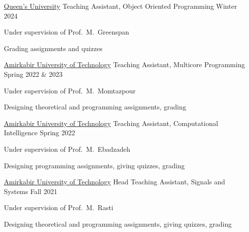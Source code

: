 
\begin{cventries}

\cventry
    {\href{https://www.queensu.ca/}{Queen's University}} %
    {Teaching Assistant, Object Oriented Programming} %
    {} %
    {Winter 2024} %
    {
      \begin{cvitems} %
        \item {Under supervision of Prof.~M.~Greenspan}
        \item {Grading assignments and quizzes}
      \end{cvitems}
    }

\cventry
    {\href{https://aut.ac.ir/}{Amirkabir University of Technology}} %
    {Teaching Assistant, Multicore Programming} %
    {} %
    {Spring 2022 \& 2023} %
    {
      \begin{cvitems} %
        \item {Under supervision of Prof.~M.~Momtazpour}
        \item {Designing theoretical and programming assignments, grading}
      \end{cvitems}
    }

  \cventry
    {\href{https://aut.ac.ir/}{Amirkabir University of Technology}} %
    {Teaching Assistant, Computational Intelligence} %
    {} %
    {Spring 2022} %
    {
      \begin{cvitems} %
        \item {Under supervision of Prof.~M.~Ebadzadeh}
        \item {Designing programming assignments, giving quizzes, grading}
      \end{cvitems}
    }
    
  \cventry
    {\href{https://aut.ac.ir/}{Amirkabir University of Technology}} %
    {Head Teaching Assistant, Signals and Systems} %
    {} %
    {Fall 2021} %
    {
      \begin{cvitems} %
        \item {Under supervision of Prof.~M.~Rasti}
        \item {Designing theoretical and programming assignments, giving quizzes, grading}
      \end{cvitems}
    }
   

\end{cventries}
